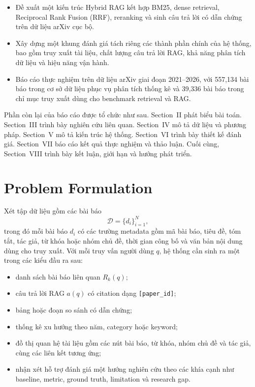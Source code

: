 \documentclass[conference]{IEEEtran}
\begin{document}
\begin{itemize}
    \item Đề xuất một kiến trúc Hybrid RAG kết hợp BM25, dense retrieval, Reciprocal Rank Fusion (RRF), reranking và sinh câu trả lời có dẫn chứng trên dữ liệu arXiv cục bộ.
    \item Xây dựng một khung đánh giá tách riêng các thành phần chính của hệ thống, bao gồm truy xuất tài liệu, chất lượng câu trả lời RAG, khả năng phân tích dữ liệu và hiệu năng vận hành.
    \item Báo cáo thực nghiệm trên dữ liệu arXiv giai đoạn 2021--2026, với 557,134 bài báo trong cơ sở dữ liệu phục vụ phân tích thống kê và 39,336 bài báo trong chỉ mục truy xuất dùng cho benchmark retrieval và RAG.
\end{itemize}

Phần còn lại của báo cáo được tổ chức như sau. Section~II phát biểu bài toán. Section~III trình bày nghiên cứu liên quan. Section~IV mô tả dữ liệu và phương pháp. Section~V mô tả kiến trúc hệ thống. Section~VI trình bày thiết kế đánh giá. Section~VII báo cáo kết quả thực nghiệm và thảo luận. Cuối cùng, Section~VIII trình bày kết luận, giới hạn và hướng phát triển.

\section{Problem Formulation}

Xét tập dữ liệu gồm các bài báo
\[
\mathcal{D}=\{d_i\}_{i=1}^{N},
\]
trong đó mỗi bài báo $d_i$ có các trường metadata gồm mã bài báo, tiêu đề, tóm tắt, tác giả, từ khóa hoặc nhóm chủ đề, thời gian công bố và văn bản nội dung dùng cho truy xuất. Với mỗi truy vấn người dùng $q$, hệ thống cần sinh ra một trong các kiểu đầu ra sau:

\begin{itemize}
    \item danh sách bài báo liên quan $R_k(q)$;
    \item câu trả lời RAG $a(q)$ có citation dạng \texttt{[paper\_id]};
    \item bảng hoặc đoạn so sánh có dẫn chứng;
    \item thống kê xu hướng theo năm, category hoặc keyword;
    \item đồ thị quan hệ tài liệu gồm các nút bài báo, từ khóa, nhóm chủ đề và tác giả, cùng các liên kết tương ứng;
    \item nhận xét hỗ trợ đánh giá một hướng nghiên cứu theo các khía cạnh như baseline, metric, ground truth, limitation và research gap.
\end{itemize}
\end{document}
